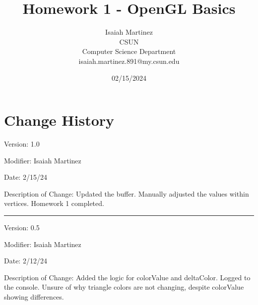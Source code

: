 \documentclass[a4paper,10pt]{article}
\begin{document}
%
   \title{Homework 1 - OpenGL Basics}

   \author{Isaiah Martinez \\ CSUN \\ Computer Science Department \\ isaiah.martinez.891@my.csun.edu}
          
   \date{02/15/2024}

   \maketitle
   
   \tableofcontents
 
   \newpage
    
   \section{Change History}

   Version: 1.0

   Modifier: Isaiah Martinez
   
   Date: 2/15/24
   
   Description of Change: Updated the buffer. 
   Manually adjusted the values within vertices.
   Homework 1 completed.

   \noindent\rule{12cm}{0.4pt}

   Version: 0.5
   
   Modifier: Isaiah Martinez
   
   Date: 2/12/24
   
   Description of Change: Added the logic for colorValue and deltaColor. 
   Logged to the console. 
   Unsure of why triangle colors are not changing, despite colorValue showing differences.


   
   
   
   
   
   
\end{document}

